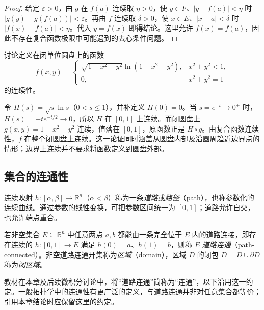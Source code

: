 \documentclass[UTF8,12pt,a4paper,fontset=fandol]{ctexbook}
\begin{document}
\begin{proof}
给定 $\varepsilon>0$，由 $g$ 在 $f(a)$ 连续取 $\eta>0$，使 $y\in F$、$|y-f(a)|<\eta$ 时 $|g(y)-g(f(a))|<\varepsilon$。再由 $f$ 连续取 $\delta>0$，使 $x\in E$、$|x-a|<\delta$ 时 $|f(x)-f(a)|<\eta$。代入 $y=f(x)$ 即得结论。这里允许 $f(x)=f(a)$，因此不存在复合函数极限中可能遇到的去心条件问题。
\end{proof}

\begin{example}
\label{ex:disk-logarithm-continuous-extension}
讨论定义在闭单位圆盘上的函数
\[
    f(x,y)=\begin{cases}
        \sqrt{1-x^2-y^2}\ln(1-x^2-y^2),&x^2+y^2<1,\\
        0,&x^2+y^2=1
    \end{cases}
\]
的连续性。
\end{example}

\begin{solve}
令 $H(s)=\sqrt s\ln s$（$0<s\leq1$），并补定义 $H(0)=0$。当 $s=e^{-t}\to0^+$ 时，$H(s)=-te^{-t/2}\to0$，所以 $H$ 在 $[0,1]$ 上连续。而闭圆盘上 $g(x,y)=1-x^2-y^2$ 连续，值落在 $[0,1]$，原函数正是 $H\circ g$。由复合函数连续性，$f$ 在整个闭圆盘上连续。这一论证同时涵盖从圆盘内部及沿圆周趋近边界点的情形；边界上连续并不要求将函数定义到圆盘外部。
\end{solve}

\subsection{集合的连通性}
\label{subsec:connectedness-of-sets}

连续映射 $h:[\alpha,\beta]\to\mathbb R^n$（$\alpha<\beta$）称为一条\emph{道路}或\emph{路径}（path），也称参数化的连续曲线。通过参数的线性变换，可把参数区间统一为 $[0,1]$；道路允许自交，也允许端点重合。

\begin{definition}
\label{def:path-connected-set-and-domain}
若非空集合 $E\subseteq\mathbb R^n$ 中任意两点 $a,b$ 都能由一条完全位于 $E$ 内的道路连接，即存在连续的 $h:[0,1]\to E$ 满足 $h(0)=a$、$h(1)=b$，则称 $E$ \emph{道路连通}（path-connected）。非空道路连通开集称为\emph{区域}（domain），区域 $D$ 的闭包 $\overline D=D\cup\partial D$ 称为\emph{闭区域}。
\end{definition}

\begin{notealert}[type=caution,title={本章的连通性约定}]
教材在本章及后续微积分讨论中，将“道路连通”简称为“连通”，以下沿用这一约定。一般拓扑学中的连通性有更广泛的定义，与道路连通并非对任意集合都等价；引用本章结论时应保留这里的约定。
\end{notealert}
\end{document}
